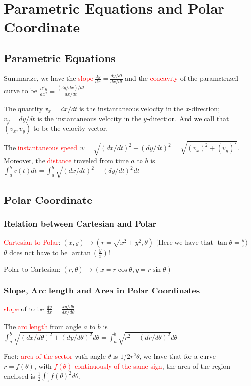 \documentclass[12pt]{article}
\theoremstyle{definition}
\theoremstyle{definition}
\theoremstyle{remark}
\theoremstyle{definition}
\theoremstyle{definition}
\theoremstyle{definition}
\begin{document}
\section{Parametric Equations and Polar Coordinate}
\subsection{Parametric Equations}

Summarize, we have the \textcolor{red}{slope}:$\frac{dy}{dx}=\frac{dy/dt}{dx/dt}$
and the \textcolor{red}{concavity} of the parametrized curve to be
$\frac{d^2y}{dx^2}=\frac{(dy/dx)/dt}{dx/dt}$

The quantity $v_x = dx/dt$ is the instantaneous velocity in the $x$-direction; $v_y = dy/dt$ is the
instantaneous velocity in the $y$-direction.
And we call that $(v_x,v_y)$ to be the velocity vector.

The \textcolor{red}{instantaneous speed} :$v = \sqrt{(dx/dt)^2 + (dy/dt)^2} =\sqrt{(v_x)^2 + (v_y)^2}$.\\


Moreover, the \textcolor{red}{distance} traveled from time $a$ to $b$ is $\int^b_a v(t) dt = \int_a^b \sqrt{(dx/dt)^2 + (dy/dt)^2} dt$

\subsection{Polar Coordinate}


\subsubsection{Relation between Cartesian and Polar}

\textcolor{red}{Cartesian to Polar}: $(x,y) \to (r= \sqrt{x^2 + y^2}, \theta) \text{ (Here we have that } \tan \theta = \frac{y}{x} \text{)}$
$\theta$ does not have to be $\arctan(\frac{y}{x})$!

Polar to Cartesian: $(r,\theta) \to (x=r \cos \theta, y=r \sin \theta)$

\subsubsection{Slope, Arc length and Area in Polar Coordinates}
\textcolor{red}{slope} of to be 
$\frac{dy}{dx}=\frac{dy/d\theta}{dx/d\theta}$

The \textcolor{red}{arc length} from angle $a$ to $b$ is $\int_a^b \sqrt{(dx/d\theta)^2 + (dy/d\theta)^2} d\theta=\int_a^b \sqrt{r^2 + (dr/d\theta)^2} d\theta$

Fact: \textcolor{red}{area of the sector} with angle $\theta$ is $1/2 r^2 \theta$, we have that for a curve $r = f(\theta)$, with \textcolor{red}{$f(\theta)$ continuously of the same sign}, the area of the region enclosed is $\frac{1}{2}\int^{b}_{a}f(\theta)^2 d\theta$.
\end{document}
